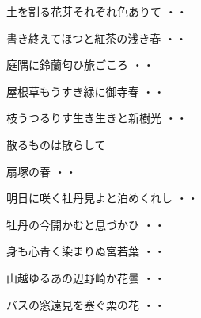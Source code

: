 \begin{shiika}土を割る花芽それぞれ色ありて
\hfill{・・}\end{shiika}
\vspace{0.6cm}
\begin{shiika}書き終えてほつと紅茶の浅き春
\hfill{・・}\end{shiika}
\vspace{0.6cm}
\begin{shiika}庭隅に鈴蘭匂ひ旅ごころ
\hfill{・・}\end{shiika}
\vspace{0.6cm}
\begin{shiika}屋根草もうすき緑に御寺春
\hfill{・・}\end{shiika}
\vspace{0.6cm}
\begin{shiika}枝うつるりす生き生きと新樹光
\hfill{・・}\end{shiika}
\vspace{0.6cm}
\begin{shiika}散るものは散らして

扇塚の春
\hfill{・・}\end{shiika}
\vspace{0.6cm}
\begin{shiika}明日に咲く牡丹見よと泊めくれし
\hfill{・・}\end{shiika}
\vspace{0.6cm}
\begin{shiika}牡丹の今開かむと息づかひ
\hfill{・・}\end{shiika}
\vspace{0.6cm}
\begin{shiika}身も心青く染まりぬ宮若葉
\hfill{・・}\end{shiika}
\vspace{0.6cm}
\begin{shiika}山越ゆるあの辺野崎か花曇
\hfill{・・}\end{shiika}
\vspace{0.6cm}
\begin{shiika}バスの窓遠見を塞ぐ栗の花
\hfill{・・}\end{shiika}
